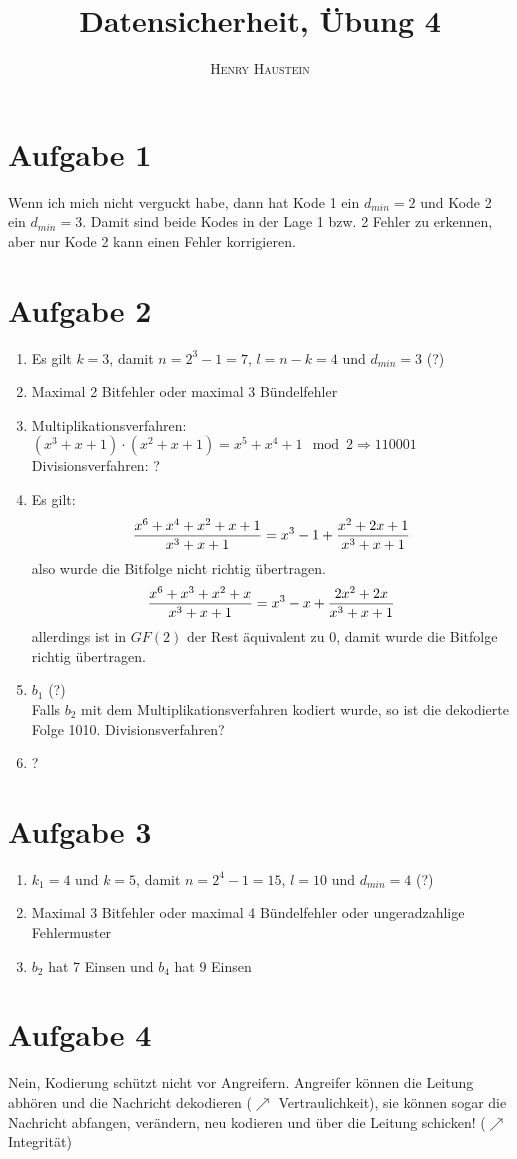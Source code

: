\documentclass{article}
\title{\textbf{Datensicherheit, Übung 4}}
\author{\textsc{Henry Haustein}}
\date{}
\begin{document}
	\maketitle
	
	\section*{Aufgabe 1}
	Wenn ich mich nicht verguckt habe, dann hat Kode 1 ein $d_{min}=2$ und Kode 2 ein $d_{min}=3$. Damit sind beide Kodes in der Lage 1 bzw. 2 Fehler zu erkennen, aber nur Kode 2 kann einen Fehler korrigieren.

	\section*{Aufgabe 2}
	\begin{enumerate}[label=(\alph*)]
		\item Es gilt $k=3$, damit $n = 2^3-1 = 7$, $l=n-k = 4$ und $d_{min} = 3$ (?)
		\item Maximal 2 Bitfehler oder maximal 3 Bündelfehler
		\item Multiplikationsverfahren: $(x^3+x+1)\cdot (x^2+x+1) = x^5 + x^4 + 1\mod 2\Rightarrow 110001$ \\
		Divisionsverfahren: ?
		\item Es gilt:
		\begin{align}
			\frac{x^6+x^4+x^2+x+1}{x^3+x+1} = x^3-1 + \frac{x^2+2x+1}{x^3+x+1} \notag
		\end{align}
		also wurde die Bitfolge nicht richtig übertragen.
		\begin{align}
			\frac{x^6+x^3+x^2+x}{x^3+x+1} = x^3-x + \frac{2x^2+2x}{x^3+x+1} \notag
		\end{align}
		allerdings ist in $GF(2)$ der Rest äquivalent zu 0, damit wurde die Bitfolge richtig übertragen.
		\item $b_1$ (?) \\
		Falls $b_2$ mit dem Multiplikationsverfahren kodiert wurde, so ist die dekodierte Folge 1010. Divisionsverfahren?
		\item ?
	\end{enumerate}
	
	\section*{Aufgabe 3}
	\begin{enumerate}[label=(\alph*)]
		\item $k_1=4$ und $k=5$, damit $n = 2^4-1 = 15$, $l = 10$ und $d_{min} = 4$ (?)
		\item Maximal 3 Bitfehler oder maximal 4 Bündelfehler oder ungeradzahlige Fehlermuster
		\item $b_2$ hat 7 Einsen und $b_4$ hat 9 Einsen
	\end{enumerate}
	
	\section*{Aufgabe 4}
	Nein, Kodierung schützt nicht vor Angreifern. Angreifer können die Leitung abhören und die Nachricht dekodieren ($\nearrow$ Vertraulichkeit), sie können sogar die Nachricht abfangen, verändern, neu kodieren und über die Leitung schicken! ($\nearrow$ Integrität)
\end{document}
